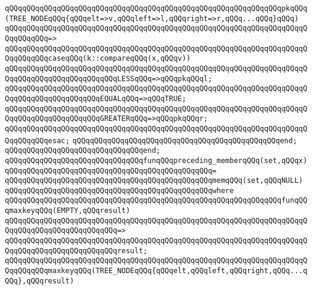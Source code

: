 \newline
\verb|qQQqqQQqqQQqqQQqqQQqqQQqqQQqqQQqqQQqqQQqqQQqqQQqqQQqqQQqqQQqqQQqpkqQQq(TREE_NODEqQQq{qQQqelt=>v,qQQqleft=>l,qQQqright=>r,qQQq...qQQq}qQQq)|\newline
\verb|qQQqqQQqqQQqqQQqqQQqqQQqqQQqqQQqqQQqqQQqqQQqqQQqqQQqqQQqqQQqqQQqqQQqqQQqqQQqqQQq=>|\newline
\verb|qQQqqQQqqQQqqQQqqQQqqQQqqQQqqQQqqQQqqQQqqQQqqQQqqQQqqQQqqQQqqQQqqQQqqQQqqQQqqQQqcaseqQQq(k::compareqQQq(x,qQQqv))|\newline
\verb|qQQqqQQqqQQqqQQqqQQqqQQqqQQqqQQqqQQqqQQqqQQqqQQqqQQqqQQqqQQqqQQqqQQqqQQqqQQqqQQqqQQqqQQqqQQqqQQqLESSqQQq=>qQQqpkqQQql;|\newline
\verb|qQQqqQQqqQQqqQQqqQQqqQQqqQQqqQQqqQQqqQQqqQQqqQQqqQQqqQQqqQQqqQQqqQQqqQQqqQQqqQQqqQQqqQQqqQQqEQUALqQQq=>qQQqTRUE;|\newline
\verb|qQQqqQQqqQQqqQQqqQQqqQQqqQQqqQQqqQQqqQQqqQQqqQQqqQQqqQQqqQQqqQQqqQQqqQQqqQQqqQQqqQQqqQQqqQQqGREATERqQQq=>qQQqpkqQQqr;|\newline
\verb|qQQqqQQqqQQqqQQqqQQqqQQqqQQqqQQqqQQqqQQqqQQqqQQqqQQqqQQqqQQqqQQqqQQqqQQqqQQqqQQqesac;|\newline
\verb|qQQqqQQqqQQqqQQqqQQqqQQqqQQqqQQqqQQqqQQqqQQqqQQqend;|\newline
\verb|qQQqqQQqqQQqqQQqqQQqqQQqqQQqqQQqend;|\newline
\verb|qQQqqQQqqQQqqQQqqQQqqQQqqQQqqQQqfunqQQqpreceding_memberqQQq(set,qQQqx)|\newline
\verb|qQQqqQQqqQQqqQQqqQQqqQQqqQQqqQQqqQQqqQQqqQQqqQQq=|\newline
\verb|qQQqqQQqqQQqqQQqqQQqqQQqqQQqqQQqqQQqqQQqqQQqqQQqmemqQQq(set,qQQqNULL)|\newline
\verb|qQQqqQQqqQQqqQQqqQQqqQQqqQQqqQQqqQQqqQQqqQQqqQQqwhere|\newline
\verb|qQQqqQQqqQQqqQQqqQQqqQQqqQQqqQQqqQQqqQQqqQQqqQQqqQQqqQQqqQQqqQQqfunqQQqmaxkeyqQQq(EMPTY,qQQqresult)|\newline
\verb|qQQqqQQqqQQqqQQqqQQqqQQqqQQqqQQqqQQqqQQqqQQqqQQqqQQqqQQqqQQqqQQqqQQqqQQqqQQqqQQqqQQqqQQqqQQqqQQq=>|\newline
\verb|qQQqqQQqqQQqqQQqqQQqqQQqqQQqqQQqqQQqqQQqqQQqqQQqqQQqqQQqqQQqqQQqqQQqqQQqqQQqqQQqqQQqqQQqqQQqqQQqresult;|\newline
\newline
\verb|qQQqqQQqqQQqqQQqqQQqqQQqqQQqqQQqqQQqqQQqqQQqqQQqqQQqqQQqqQQqqQQqqQQqqQQqqQQqqQQqmaxkeyqQQq(TREE_NODEqQQq{qQQqelt,qQQqleft,qQQqright,qQQq...qQQq},qQQqresult)|\newline
